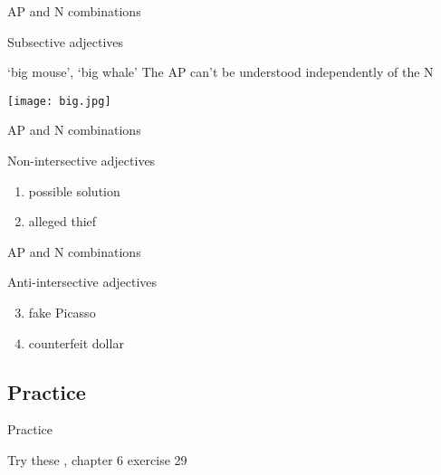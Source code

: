 \documentclass{beamer}
\newcommand{\subonethree}{AP and N combinations}
\newcommand{\subonefour}{Practice}
\begin{document}
      \begin{frame}{\subonethree}
        \begin{alertblock}{Subsective adjectives}
          
        \end{alertblock}
        \begin{block}{`big mouse', `big whale'}
          The AP can't be understood independently of the N
        \end{block}
        \begin{center}
          \texttt{[image: big.jpg]}
        \end{center}
      \end{frame}

      \begin{frame}{\subonethree}
        \begin{alertblock}{Non-intersective adjectives}
          
        \end{alertblock}
        \begin{example}
          \begin{enumerate}
            \item possible solution
            \item alleged thief
          \end{enumerate}
        \end{example}
      \end{frame}

      \begin{frame}{\subonethree}
        \begin{alertblock}{Anti-intersective adjectives}
          
        \end{alertblock}
        \begin{example}
          \begin{enumerate}
            \setcounter{enumi}{2}
            \item fake Picasso
            \item counterfeit dollar
          \end{enumerate}
        \end{example}
      \end{frame}

    \subsection{\subonefour}
      \begin{frame}{\subonefour}
        \begin{block}{Try these}
          \textcite{dawson_language_2016}, chapter 6 exercise 29
        \end{block}
      \end{frame}
\end{document}
